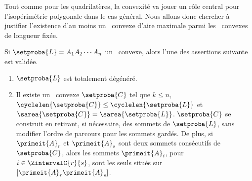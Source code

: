 Tout comme pour les quadrilatères, la convexité va jouer un rôle central pour l’isopérimétrie polygonale dans le cas général.
Nous allons donc chercher à justifier l'existence d'au moins un \ngone\ convexe d'aire maximale parmi les \ngones\ convexes de longueur fixée.




\begin{fact} \label{conv-from-non-neg-det}
    Si $\setproba{L} = A_1 A_2 \cdots A_n$ un \ncycle\ convexe, alors l'une des assertions suivante est validée.
    \begin{enumerate}
        \item $\setproba{L}$ est totalement dégénéré.

        \item Il existe un \kgone\ convexe $\setproba{C}$ tel que
        $k \leq n$,
        $\cyclelen{\setproba{C}} \leq \cyclelen{\setproba{L}}$
        et
        $\sarea{\setproba{C}} = \sarea{\setproba{L}}$.
        $\setproba{C}$ se construit en retirant, si nécessaire, des sommets de $\setproba{L}$, sans modifier l'ordre de parcours pour les sommets gardés.
        De plus,
        si $\primeit{A}_r$ et $\primeit{A}_s$ sont deux sommets consécutifs de $\setproba{C}$,
        alors les sommets $\primeit{A}_i$, pour $i \in \ZintervalC{r}{s}$, sont les seuls situés sur $[\primeit{A}_r \primeit{A}_s]$.
    \end{enumerate}
\end{fact}


